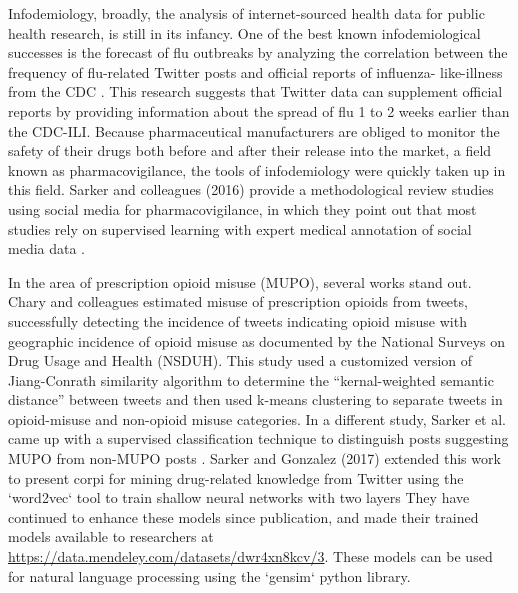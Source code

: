 \documentclass[sigconf]{acmart}
\begin{document}
Infodemiology, broadly, the analysis of internet-sourced health data for public 
health research, is still in its infancy. One of the best known infodemiological 
successes is the forecast of flu outbreaks by analyzing the correlation between 
the frequency of flu-related Twitter posts and official reports of influenza-
like-illness from the CDC \cite{culotta10, paul14}. This research suggests that 
Twitter data can supplement official reports by providing information about the 
spread of flu 1 to 2 weeks earlier than the CDC-ILI. Because pharmaceutical 
manufacturers are obliged to monitor the safety of their drugs both before and 
after their release into the market, a field known as pharmacovigilance, the 
tools of infodemiology were quickly taken up in this field. Sarker and 
colleagues (2016) provide a methodological review studies using social media 
for pharmacovigilance, in which they point out that most studies rely on 
supervised learning with expert medical annotation of social media data 
\cite{sarker16}. 

In the area of prescription opioid misuse (MUPO), several works stand out. 
Chary and colleagues estimated misuse of prescription opioids from tweets, 
successfully detecting the incidence of tweets indicating opioid misuse with 
geographic incidence of opioid misuse as documented by the National Surveys 
on Drug Usage and Health (NSDUH)\cite{chary17}. This study used a customized 
version of Jiang-Conrath similarity algorithm \cite{jiang97} to determine the 
``kernal-weighted semantic distance'' between tweets and then used k-means 
clustering to separate tweets in opioid-misuse and non-opioid misuse 
categories. In a different study, Sarker et al. came up with a supervised 
classification technique to distinguish posts suggesting MUPO from non-MUPO 
posts \cite{sarker15}. Sarker and Gonzalez (2017) extended this work to present 
corpi for mining drug-related knowledge from Twitter using the `word2vec` tool 
to train shallow neural networks with two layers \cite{sarker17} They have 
continued to enhance these models since publication, and made their trained 
models available to researchers at 
\url{https://data.mendeley.com/datasets/dwr4xn8kcv/3}. These models can be 
used for natural language processing using the `gensim` python library.

\end{document}
